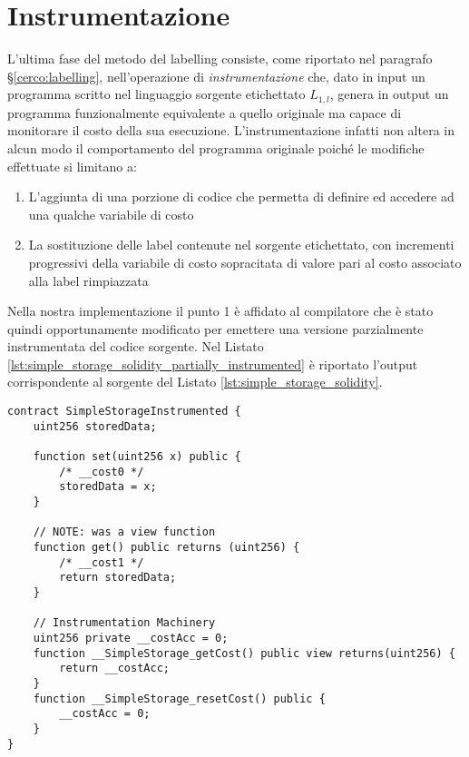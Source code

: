 \documentclass[12pt,a4paper,openright,oneside]{report}
\theoremstyle{definition}
\begin{document}
\section{Instrumentazione}\label{impl:instrumentation}
L'ultima fase del metodo del labelling consiste, come riportato nel paragrafo \S\ref{cerco:labelling}, nell'operazione di \textit{instrumentazione} che, dato in input un programma scritto nel linguaggio sorgente etichettato $L_{1,l}$, genera in output un programma funzionalmente equivalente a quello originale ma capace di monitorare il costo della sua esecuzione. L'instrumentazione infatti non altera in alcun modo il comportamento del programma originale poich\'{e} le modifiche effettuate si limitano a:
\begin{enumerate}
    \item L'aggiunta di una porzione di codice che permetta di definire ed accedere ad una qualche variabile di costo
    \item La sostituzione delle label contenute nel sorgente etichettato, con incrementi progressivi della variabile di costo sopracitata di valore pari al costo associato alla label rimpiazzata
\end{enumerate}
Nella nostra implementazione il punto 1 \`{e} affidato al compilatore che \`{e} stato quindi opportunamente modificato per emettere una versione parzialmente instrumentata del codice sorgente. Nel Listato \ref{lst:simple_storage_solidity_partially_instrumented} \`{e} riportato l'output corrispondente al sorgente del Listato \ref{lst:simple_storage_solidity}.
\begin{lstlisting}[language=Solidity,caption=Instrumentazione parziale di \ref{lst:simple_storage_solidity},label={lst:simple_storage_solidity_partially_instrumented},frame=tlrb]
contract SimpleStorageInstrumented {
    uint256 storedData;

    function set(uint256 x) public {
        /* __cost0 */
        storedData = x;
    }

    // NOTE: was a view function
    function get() public returns (uint256) {
        /* __cost1 */
        return storedData;
    }
    
    // Instrumentation Machinery
    uint256 private __costAcc = 0;
    function __SimpleStorage_getCost() public view returns(uint256) {
        return __costAcc;
    }
    function __SimpleStorage_resetCost() public {
        __costAcc = 0;
    }
}
\end{lstlisting}
\end{document}
